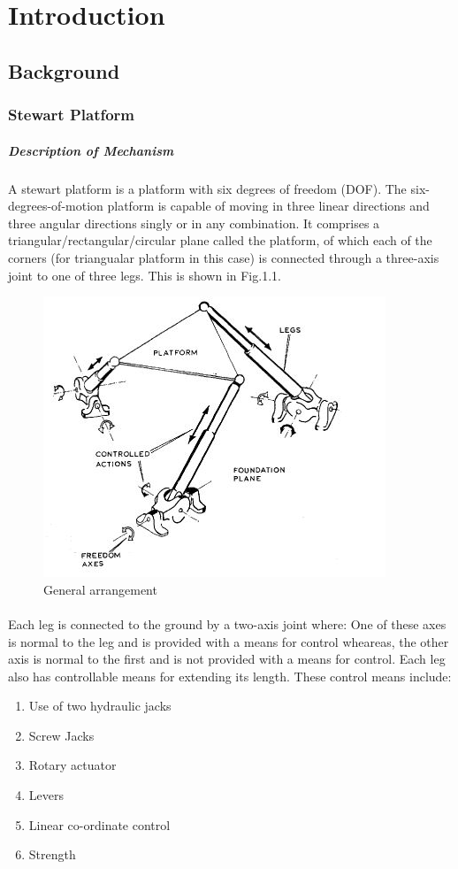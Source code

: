 \section{Introduction}
\subsection{Background}
\subsubsection{Stewart Platform}
\subparagraph*{Description of Mechanism}
\paragraph{}A stewart platform is a platform with six degrees of freedom (DOF). The six-degrees-of-motion platform is capable of moving in three linear directions and
three angular directions singly or in any combination.
It comprises a triangular/rectangular/circular plane called the platform, of which each of the corners (for triangualar platform in this case) is connected through a three-axis joint to one of three legs. This is shown in Fig.1.1.
\begin{figure}[!h]
\includegraphics{Figures/Fig1}
\caption{General arrangement}
\end{figure}
\paragraph{}Each leg is connected to the ground by a two-axis joint where: One of these axes is
normal to the leg and is provided with a means for control wheareas, the other axis is normal to the first and is not provided with a means for control.
Each leg also has controllable means for extending its length. These control means include:
\begin{enumerate}
\item Use of two hydraulic jacks
\item Screw Jacks
\item Rotary actuator
\item Levers
\item Linear co-ordinate control
\item Strength
\end{enumerate}
